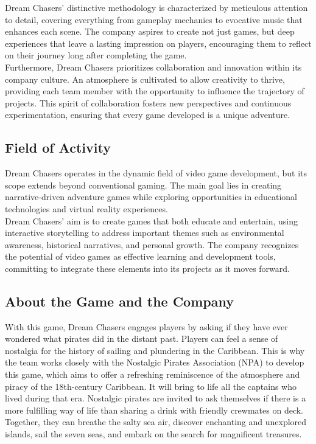 \documentclass{article}
\begin{document}
Dream Chasers' distinctive methodology is characterized by meticulous attention to detail, covering everything from gameplay mechanics to evocative music that enhances each scene. The company aspires to create not just games, but deep experiences that leave a lasting impression on players, encouraging them to reflect on their journey long after completing the game.\\

Furthermore, Dream Chasers prioritizes collaboration and innovation within its company culture. An atmosphere is cultivated to allow creativity to thrive, providing each team member with the opportunity to influence the trajectory of projects. This spirit of collaboration fosters new perspectives and continuous experimentation, ensuring that every game developed is a unique adventure.





\subsection{Field of Activity}\hfill

Dream Chasers operates in the dynamic field of video game development, but its scope extends beyond conventional gaming. The main goal lies in creating narrative-driven adventure games while exploring opportunities in educational technologies and virtual reality experiences.\\

Dream Chasers' aim is to create games that both educate and entertain, using interactive storytelling to address important themes such as environmental awareness, historical narratives, and personal growth. The company recognizes the potential of video games as effective learning and development tools, committing to integrate these elements into its projects as it moves forward.





\subsection{About the Game and the Company}\hfill

With this game, Dream Chasers engages players by asking if they have ever wondered what pirates did in the distant past. Players can feel a sense of nostalgia for the history of sailing and plundering in the Caribbean. This is why the team works closely with the Nostalgic Pirates Association (NPA) to develop this game, which aims to offer a refreshing reminiscence of the atmosphere and piracy of the 18th-century Caribbean. It will bring to life all the captains who lived during that era. Nostalgic pirates are invited to ask themselves if there is a more fulfilling way of life than sharing a drink with friendly crewmates on deck. Together, they can breathe the salty sea air, discover enchanting and unexplored islands, sail the seven seas, and embark on the search for magnificent treasures.\\
\end{document}
